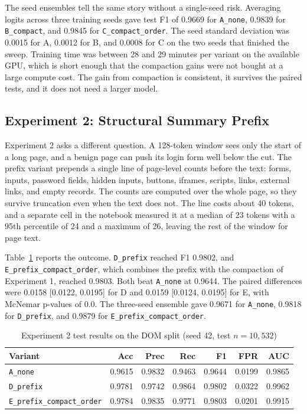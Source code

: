 \documentclass{FastFyp}
\begin{document}
The seed ensembles tell the same story without a single-seed risk. Averaging logits across three training seeds gave test F1 of 0.9669 for \texttt{A\_none}, 0.9839 for \texttt{B\_compact}, and 0.9845 for \texttt{C\_compact\_order}. The seed standard deviation was 0.0015 for A, 0.0012 for B, and 0.0008 for C on the two seeds that finished the sweep. Training time was between 28 and 29 minutes per variant on the available GPU, which is short enough that the compaction gains were not bought at a large compute cost. The gain from compaction is consistent, it survives the paired tests, and it does not need a larger model.

\subsection{Experiment 2: Structural Summary Prefix}
\label{subsec:exp2}

Experiment 2 asks a different question. A 128-token window sees only the start of a long page, and a benign page can push its login form well below the cut. The prefix variant prepends a single line of page-level counts before the text: forms, inputs, password fields, hidden inputs, buttons, iframes, scripts, links, external links, and empty records. The counts are computed over the whole page, so they survive truncation even when the text does not. The line costs about 40 tokens, and a separate cell in the notebook measured it at a median of 23 tokens with a 95th percentile of 24 and a maximum of 26, leaving the rest of the window for page text.

Table~\ref{tab:exp2} reports the outcome. \texttt{D\_prefix} reached F1 0.9802, and \texttt{E\_prefix\_compact\_order}, which combines the prefix with the compaction of Experiment 1, reached 0.9803. Both beat \texttt{A\_none} at 0.9644. The paired differences were 0.0158 [0.0122, 0.0195] for D and 0.0159 [0.0124, 0.0195] for E, with McNemar p-values of 0.0. The three-seed ensemble gave 0.9671 for \texttt{A\_none}, 0.9818 for \texttt{D\_prefix}, and 0.9879 for \texttt{E\_prefix\_compact\_order}.

\begin{table}[htbp]
\centering
\caption{Experiment 2 test results on the DOM split (seed 42, test $n=10{,}532$)}
\label{tab:exp2}
\begin{tabular}{lrrrrrr}
\hline
Variant & Acc & Prec & Rec & F1 & FPR & AUC \\
\hline
\texttt{A\_none} & 0.9615 & 0.9832 & 0.9463 & 0.9644 & 0.0199 & 0.9865 \\
\texttt{D\_prefix} & 0.9781 & 0.9742 & 0.9864 & 0.9802 & 0.0322 & 0.9962 \\
\texttt{E\_prefix\_compact\_order} & 0.9784 & 0.9835 & 0.9771 & 0.9803 & 0.0201 & 0.9915 \\
\hline
\end{tabular}
\end{table}
\end{document}
